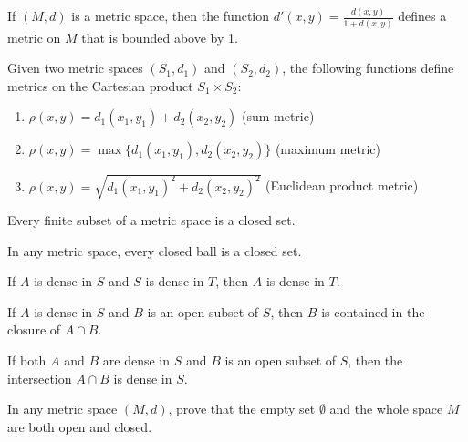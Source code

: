 \begin{theorem}
If $(M,d)$ is a metric space, then the function $d'(x,y) = \frac{d(x,y)}{1 + d(x,y)}$ defines a metric on $M$ that is bounded above by 1.
\end{theorem}

\begin{theorem}
Given two metric spaces $(S_1,d_1)$ and $(S_2,d_2)$, the following functions define metrics on the Cartesian product $S_1 \times S_2$:
\begin{enumerate}
\item $\rho(x,y) = d_1(x_1,y_1) + d_2(x_2,y_2)$ (sum metric)
\item $\rho(x,y) = \max\{d_1(x_1,y_1), d_2(x_2,y_2)\}$ (maximum metric)
\item $\rho(x,y) = \sqrt{d_1(x_1,y_1)^2 + d_2(x_2,y_2)^2}$ (Euclidean product metric)
\end{enumerate}
\end{theorem}

\begin{theorem}
Every finite subset of a metric space is a closed set.
\end{theorem}

\begin{theorem}
In any metric space, every closed ball is a closed set.
\end{theorem}

\begin{theorem}
If $A$ is dense in $S$ and $S$ is dense in $T$, then $A$ is dense in $T$.
\end{theorem}

\begin{theorem}
If $A$ is dense in $S$ and $B$ is an open subset of $S$, then $B$ is contained in the closure of $A \cap B$.
\end{theorem}

\begin{theorem}
If both $A$ and $B$ are dense in $S$ and $B$ is an open subset of $S$, then the intersection $A \cap B$ is dense in $S$.
\end{theorem}



\begin{problembox}
In any metric space \((M, d)\), prove that the empty set \( \emptyset \) and the whole space \( M \) are both open and closed.
\end{problembox}

